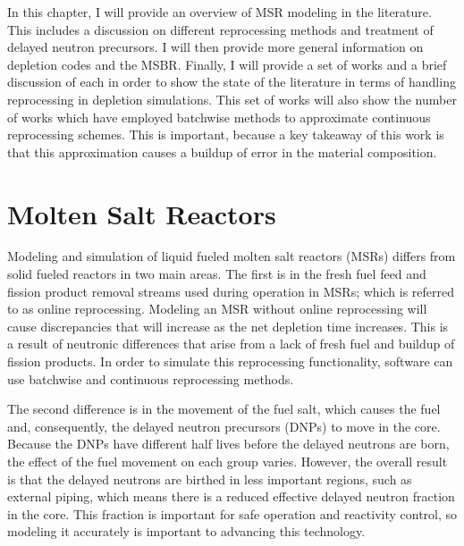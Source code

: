 \renewcommand*\descriptionlabel[1]{\hspace\leftmargin$#1$}
\setcounter{tocdepth}{5}
\setcounter{secnumdepth}{5}

In this chapter, I will provide an overview of MSR modeling in the literature. This includes a discussion on different reprocessing methods and treatment of delayed neutron precursors. I will then provide more general information on depletion codes and the MSBR. Finally, I will provide a set of works and a brief discussion of each in order to show the state of the literature in terms of handling reprocessing in depletion simulations. This set of works will also show the number of works which have employed batchwise methods to approximate continuous reprocessing schemes. This is important, because a key takeaway of this work is that this approximation causes a buildup of error in the material composition.

\section{Molten Salt Reactors}

Modeling and simulation of liquid fueled molten salt reactors (MSRs) differs from solid fueled reactors in two main areas. The first is in the fresh fuel feed and fission product removal streams used during operation in MSRs; which is referred to as online reprocessing. Modeling an MSR without online reprocessing will cause discrepancies that will increase as the net depletion time increases.
This is a result of neutronic differences that arise from a lack of fresh fuel and buildup of fission products. In order to simulate this reprocessing functionality, software can use batchwise and continuous reprocessing methods.

The second difference is in the movement of the fuel salt, which causes the fuel and, consequently, the delayed neutron precursors (DNPs) to move in the core. Because the DNPs have different half lives before the delayed neutrons are born, the effect of the fuel movement on each group varies. However, the overall result is that the delayed neutrons are birthed in less important regions, such as external piping, which means there is a reduced effective delayed neutron fraction in the core.
This fraction is important for safe operation and reactivity control, so modeling it accurately is important to advancing this technology.

